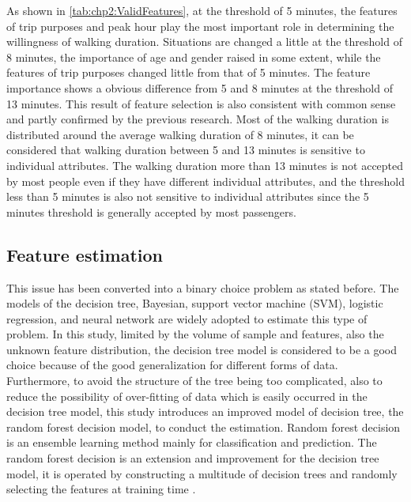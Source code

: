 As shown in \ref{tab:chp2:ValidFeatures}, at the threshold of 5 minutes, the features of trip purposes and peak hour play the most important role in determining the willingness of walking duration. Situations are changed a little at the threshold of 8 minutes, the importance of age and gender raised in some extent, while the features of trip purposes changed little from that of 5 minutes. The feature importance shows a obvious difference from 5 and 8 minutes at the threshold of 13 minutes. This result of feature selection is also consistent with common sense and partly confirmed by the previous research. Most of the walking duration is distributed around the average walking duration of 8 minutes, it can be considered that walking duration between 5 and 13 minutes is sensitive to individual attributes. The walking duration more than 13 minutes is not accepted by most people even if they have different individual attributes, and the threshold less than 5 minutes is also not sensitive to individual attributes since the 5 minutes threshold is generally accepted by most passengers.

%
\subsection{Feature estimation}

This issue has been converted into a binary choice problem as stated before. The models of the decision tree, Bayesian, support vector machine (SVM), logistic regression, and neural network are widely adopted to estimate this type of problem. In this study, limited by the volume of sample and features, also the unknown feature distribution, the decision tree model is considered to be a good choice because of the good generalization for different forms of data. Furthermore, to avoid the structure of the tree being too complicated, also to reduce the possibility of over-fitting of data which is easily occurred in the decision tree model, this study introduces an improved model of decision tree, the random forest decision model, to conduct the estimation. Random forest decision is an ensemble learning method mainly for classification and prediction. The random forest decision is an extension and improvement for the decision tree model, it is operated by constructing a multitude of decision trees and randomly selecting the features at training time \cite{ho1995random,ho1998random}. 

